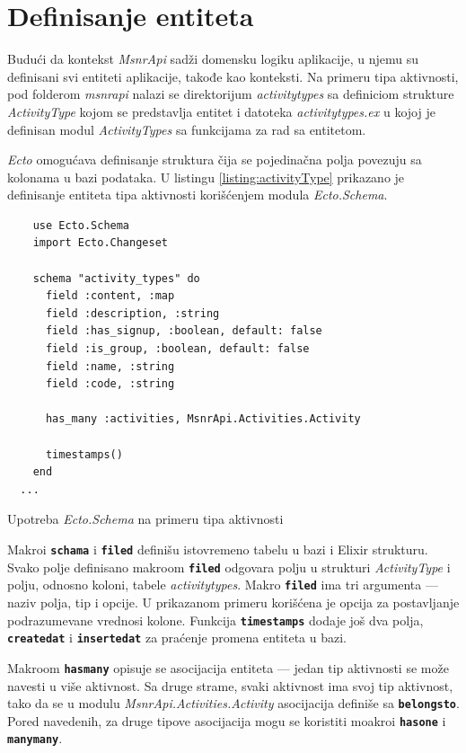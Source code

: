\documentclass[12pt,oneside]{memoir}
\begin{document}
\section{Definisanje entiteta}
Budući da kontekst \emph{MsnrApi} sadži domensku logiku aplikacije, u njemu su definisani svi entiteti aplikacije, takođe
kao konteksti. Na primeru tipa aktivnosti, pod folderom \emph{msnr{\textunderscore}api} nalazi se direktorijum
\emph{activity{\textunderscore}types} sa definiciom strukture \emph{ActivityType} kojom se predstavlja
entitet i datoteka \emph{activity{\textunderscore}types.ex} u kojoj je definisan modul \emph{ActivityTypes} sa
funkcijama za rad sa entitetom.

\emph{Ecto} omogućava definisanje struktura čija se pojedinačna polja povezuju sa kolonama u bazi podataka. 
U listingu \ref{listing:activityType} prikazano je definisanje entiteta tipa aktivnosti korišćenjem modula
\emph{Ecto.Schema}.
\begin{listing}[!h]
  \begin{verbatim}
    use Ecto.Schema
    import Ecto.Changeset
  
    schema "activity_types" do
      field :content, :map
      field :description, :string
      field :has_signup, :boolean, default: false
      field :is_group, :boolean, default: false
      field :name, :string
      field :code, :string
  
      has_many :activities, MsnrApi.Activities.Activity
  
      timestamps()
    end
  ...
\end{verbatim}
\caption{Upotreba \emph{Ecto.Schema} na primeru tipa aktivnosti }
\label{listing:activityType}
\end{listing}
Makroi \texttt{\textbf{schama}} i \texttt{\textbf{filed}} definišu istovremeno tabelu u bazi i Elixir
strukturu. Svako polje definisano makroom \texttt{\textbf{filed}} odgovara polju u strukturi 
\emph{ActivityType} i polju, odnosno koloni, tabele \emph{activity{\textunderscore}types}.
Makro \texttt{\textbf{filed}} ima tri argumenta --- naziv polja, tip i opcije. U prikazanom primeru korišćena je
opcija za postavljanje podrazumevane vrednosi kolone. Funkcija \texttt{\textbf{timestamps}} dodaje još dva polja,
\texttt{\textbf{created{\textunderscore}at}} i \texttt{\textbf{inserted{\textunderscore}at}} za praćenje 
promena entiteta u bazi. 

Makroom \texttt{\textbf{has{\textunderscore}many}} opisuje se asocijacija 
entiteta --- jedan tip aktivnosti se može navesti u više aktivnost. Sa druge strame, svaki aktivnost ima svoj tip
aktivnost, tako da se u modulu \emph{MsnrApi.Activities.Activity}
asocijacija definiše sa \texttt{\textbf{belongs{\textunderscore}to}}. Pored navedenih, za druge tipove asocijacija
mogu se koristiti moakroi \texttt{\textbf{has{\textunderscore}one}} i \texttt{\textbf{many{\textunderscore}many}}.
\end{document}
